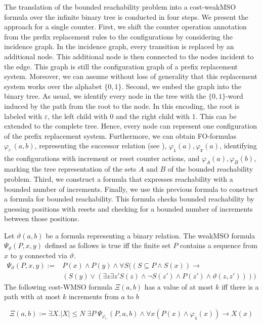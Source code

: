 \documentclass{LMCS}
\newcommand{\eps}{\varepsilon}
\newcommand{\configstep}[1][]{\vdash_{#1}}
\newcommand{\iOp}{\ensuremath{\mathtt{i}}}
\newcommand{\rOp}{\ensuremath{\mathtt{r}}}
\renewcommand{\theta}{\vartheta}
\begin{document}
The translation of the bounded reachability problem into a cost-weakMSO
formula over the infinite binary tree is conducted in four steps. We
present the approach for a single counter. First, we shift the counter operation
annotation from the prefix replacement rules to the configurations by
considering the incidence graph. In the incidence graph, every transition is
replaced by an additional node. This additional node is then connected to the 
nodes incident to the edge. This graph is still the configuration graph of
a prefix replacement system. Moreover, we can assume without loss of
generality that this replacement system works over the alphabet $\{0,1\}$.
Second, we embed the graph into the binary tree. As usual, we identify every
node in the tree with the $\{0,1\}$-word induced by the path from the root to
the node. In this encoding, the root is labeled with $\eps$, the left child
with $0$ and the right child with $1$. This can be extended to the complete
tree. Hence, every node can represent one configuration of the prefix
replacement system. Furthermore, we can obtain FO-formulas
$\varphi_{\configstep}(a,b)$, representing the successor
relation (see \cite{thomas03a}), $\varphi_\iOp(a),\varphi_\rOp(a)$,
identifying the configurations with increment or reset counter actions, and
$\varphi_A(a), \varphi_B(b)$, marking the tree representation of the
sets $A$ and $B$ of the bounded reachability problem. Third, we
construct a formula that expresses reachability with a bounded number
of increments. Finally, we use this previous formula to construct a
formula for bounded reachability. This formula checks bounded
reachability by guessing positions with resets and checking for a
bounded number of increments between those positions.

\begin{lem}\label{lem:WMSOReachability}
  Let $\theta(a,b)$ be a formula representing a binary relation. The weakMSO
formula $\Psi_{\theta}(P,x,y)$ defined as follows is true iff the finite set $P$
contains a sequence from $x$ to $y$ connected via $\theta$.
  \begin{align*}
	\Psi_{\theta}(P,x,y) := &P(x) \wedge P(y) \wedge \forall S \Big( (S \subseteq
P \wedge S(x))\rightarrow \\ 
		&(S(y) \vee (\exists z \exists z' S(z) \wedge
\neg S(z') \wedge P(z') \wedge \theta(z,z')))\Big)
  \end{align*}
  The following cost-WMSO formula $\Xi(a,b)$ has a value of at most $k$ iff
there is a
path with at most $k$ increments from $a$ to $b$

  $$ \Xi(a,b) := \exists X. |X| \le N\; \exists P\;
\Psi_{\varphi_{\configstep}}(P,a,b) \wedge \forall x (P(x) \wedge
\varphi_{\iOp}(x)) \rightarrow X(x) $$
\end{lem}
\end{document}
